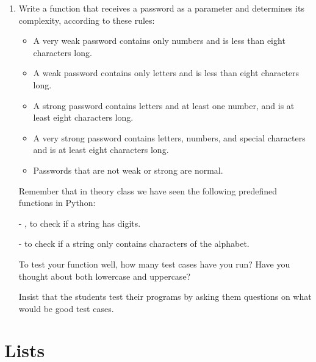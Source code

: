 \documentclass[
  fontsize=10pt,
  a4paper,
]{scrartcl}
\newenvironment{howTILEd}%
  {\begin{mdframed}[skipabove=10pt,skipbelow=10pt,backgroundcolor=pink!40]}%
  {\end{mdframed}}
\begin{document}
\begin{enumerate}
\item Write a function that receives a password as a parameter and determines its complexity, according to these rules:

\begin{itemize}
\item A very weak password contains only numbers and is less than eight characters long.

\item A weak password contains only letters and is less than eight characters long.

\item A strong password contains letters and at least one number, and is at least eight characters long.

\item A very strong password contains letters, numbers, and special characters and is at least eight characters long.

\item Passwords that are not weak or strong are normal.
\end{itemize}

Remember that in theory class we have seen the following predefined functions in Python:

- , to check if a string has digits.

-  to check if a string only contains characters of the alphabet.

To test your function well, how many test cases have you run? Have you thought about both lowercase and uppercase?


\begin{howTILEd}
Insist that the students test their programs by asking them questions on what would be good test cases.
\end{howTILEd}

\end{enumerate}


\section{Lists}
\end{document}
